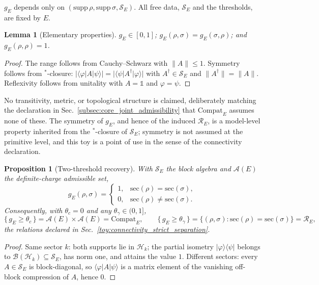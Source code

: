 \documentclass[aps,prx,onecolumn,11pt]{revtex4-2}
\theoremstyle{plain}
\newtheorem{lemma}{Lemma}
\newtheorem{proposition}{Proposition}
\theoremstyle{definition}
\theoremstyle{remark}
\begin{document}
\(g_E\) depends only on \((\mathrm{supp}\,\rho,\mathrm{supp}\,\sigma,
\mathcal S_E)\). All free data, \(\mathcal S_E\) and the thresholds, are
fixed by \(E\).

\begin{lemma}[Elementary properties]
\label{lem:toy_shadow_props}
\(g_E\in[0,1]\);
\(g_E(\rho,\sigma)=g_E(\sigma,\rho)\);
and \(g_E(\rho,\rho)=1\).
\end{lemma}

\begin{proof}
The range follows from Cauchy--Schwarz with \(\lVert A\rVert\le1\).
Symmetry follows from \({}^*\)-closure:
\(\lvert\langle\varphi\rvert A\lvert\psi\rangle\rvert
=\lvert\langle\psi\rvert A^{\dagger}\lvert\varphi\rangle\rvert\) with
\(A^{\dagger}\in\mathcal S_E\) and \(\lVert A^{\dagger}\rVert=\lVert
A\rVert\). Reflexivity follows from unitality with \(A=\mathbb 1\) and
\(\varphi=\psi\).
\end{proof}

No transitivity, metric, or topological structure is claimed,
deliberately matching the declaration in
Sec.~\ref{subsec:core_joint_admissibility} that
\(\mathrm{Compat}_E\) assumes none of these. The symmetry of
\(g_E\), and hence of the induced \(\mathcal R_E\), is a model-level
property inherited from the \({}^*\)-closure of \(\mathcal S_E\);
symmetry is not assumed at the primitive level, and this toy is a point
of use in the sense of the connectivity declaration.

\begin{proposition}[Two-threshold recovery]
\label{prop:toy_shadow_recovery}
With \(\mathcal S_E\) the block algebra and \(\mathcal A(E)\) the
definite-charge admissible set,
\[
g_E(\rho,\sigma)=
\begin{cases}
1, & \mathrm{sec}(\rho)=\mathrm{sec}(\sigma),\\[2pt]
0, & \mathrm{sec}(\rho)\neq\mathrm{sec}(\sigma).
\end{cases}
\]
Consequently, with \(\theta_c=0\) and any \(\theta_\gamma\in(0,1]\),
\[
\{\,g_E\ge\theta_c\,\}
=\mathcal A(E)\times\mathcal A(E)
=\mathrm{Compat}_E,
\qquad
\{\,g_E\ge\theta_\gamma\,\}
=\{(\rho,\sigma):\mathrm{sec}(\rho)=\mathrm{sec}(\sigma)\}
=\mathcal R_E,
\]
the relations declared in
Sec.~\ref{toy:connectivity_strict_separation}.
\end{proposition}

\begin{proof}
Same sector \(k\): both supports lie in \(\mathcal H_k\); the partial
isometry \(\lvert\varphi\rangle\langle\psi\rvert\) belongs to
\(\mathcal B(\mathcal H_k)\subseteq\mathcal S_E\), has norm one, and
attains the value \(1\). Different sectors: every
\(A\in\mathcal S_E\) is block-diagonal, so
\(\langle\varphi\rvert A\lvert\psi\rangle\) is a matrix element of the
vanishing off-block compression of \(A\), hence \(0\).
\end{proof}
\end{document}
